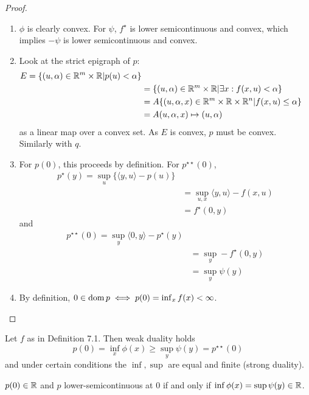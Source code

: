 \begin{proof}
  \begin{enumerate}
  \item $\phi$ is clearly convex.  For $\psi$, $f^{\star}$ is
    lower semicontinuous and convex, which implies $-\psi$ is
    lower semicontinuous and convex.
  \item Look at the strict epigraph of $p$:
    \begin{align}
      \label{eq:73}
      E = \{ (u, \alpha) \in \mathbb{R}^{m} \times \mathbb{R} | p(u) < \alpha \} \\
      &= \{ (u, \alpha) \in \mathbb{R}^{m} \times \mathbb{R} | \exists x : f(x, u) <
      \alpha \} \\
      &= A \{ (u, \alpha, x) \in \mathbb{R}^{m} \times \mathbb{R} \times \mathbb{R}^{n} | f(x,
      u) \leq \alpha \} \\
      &= A(u, \alpha, x) \mapsto (u, \alpha)
    \end{align} as a linear map over a convex set.  As $E$ is convex,
    $p$ must be convex.  Similarly with $q$.
  \item For $p(0)$, this proceeds by definition.  For $p^{\star
      \star}(0)$, 
    \begin{align}
      \label{eq:74}
      p^{\star}(y) = \sup_{u} \{ \langle y, u \rangle - p(u) \} \\
      &= \sup_{u, x} \langle y, u \rangle - f(x, u) \\
      &= f^{\star}(0, y)
    \end{align} and
    \begin{align}
      \label{eq:75}
      p^{\star \star}(0) = \sup_{y} \langle 0, y \rangle -
      p^{\star}(y) \\
      &= \sup_{y} - f^{\star}(0, y) \\
      &= \sup_{y} \psi(y)
    \end{align}
  \item By definition, $0 \in \operatorname*{dom} p \iff p(0) = \inf_{x} f(x) < \infty$.
  \end{enumerate}

\end{proof}

\begin{thm}
  \label{defn:conjugate_functions:11}
  Let $f$ as in Definition 7.1.  Then weak duality holds
  \begin{equation}
    \label{eq:60}
    p(0) = \inf_{x} \phi(x) \geq \sup_{y} \psi(y) = p^{\star \star}(0)
  \end{equation}
  and under certain conditions the $\inf, \sup$ are equal and finite
  (strong duality).

  $p(0) \in \mathbb{R}$ and $p$ lower-semicontinuous at 0 if and only if $\inf
  \phi(x) = \sup \psi(y) \in \mathbb{R}$.
\end{thm}

